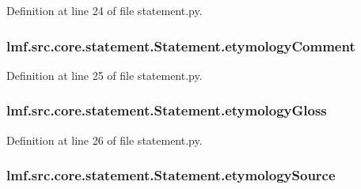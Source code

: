 Definition at line 24 of file statement.\+py.

\hypertarget{classlmf_1_1src_1_1core_1_1statement_1_1_statement_a25f9127cf2fe1017c53a3ccb57570352}{
\subsubsection[{etymology\+Comment}]{\setlength{\rightskip}{0pt plus 5cm}lmf.\+src.\+core.\+statement.\+Statement.\+etymology\+Comment}}\label{classlmf_1_1src_1_1core_1_1statement_1_1_statement_a25f9127cf2fe1017c53a3ccb57570352}


Definition at line 25 of file statement.\+py.

\hypertarget{classlmf_1_1src_1_1core_1_1statement_1_1_statement_a7d9d96cae746848b83b4ae8516c92bee}{
\subsubsection[{etymology\+Gloss}]{\setlength{\rightskip}{0pt plus 5cm}lmf.\+src.\+core.\+statement.\+Statement.\+etymology\+Gloss}}\label{classlmf_1_1src_1_1core_1_1statement_1_1_statement_a7d9d96cae746848b83b4ae8516c92bee}


Definition at line 26 of file statement.\+py.

\hypertarget{classlmf_1_1src_1_1core_1_1statement_1_1_statement_adeefdc77c6ff898b8adba4ef2a946af3}{
\subsubsection[{etymology\+Source}]{\setlength{\rightskip}{0pt plus 5cm}lmf.\+src.\+core.\+statement.\+Statement.\+etymology\+Source}}\label{classlmf_1_1src_1_1core_1_1statement_1_1_statement_adeefdc77c6ff898b8adba4ef2a946af3}


